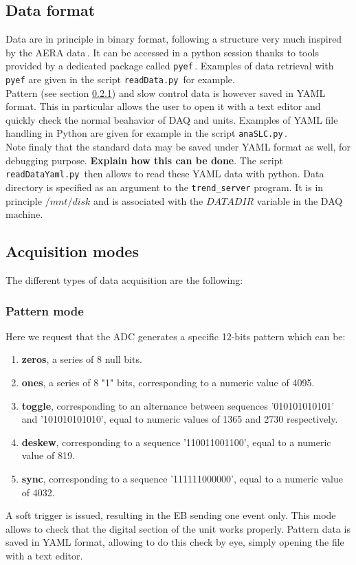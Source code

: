 \subsection{Data format}
\label{format}
Data are in principle in binary format, following a structure very much inspired by the AERA data\,\cite{DAQFormat_pres}. It can be accessed in a python session thanks to tools provided by a dedicated package called \texttt{pyef}\,\cite{pyef_git}. Examples of data retrieval with \texttt{pyef} are given in the script \texttt{readData.py}\,\cite{ana_git} for example. \\
%
Pattern (see section \ref{pattern}) and slow control data is however saved in YAML format. This in particular allows the user to open it with a text editor and quickly check the normal beahavior of DAQ and units. Examples of YAML file handling in Python are given for example in the script \texttt{anaSLC.py}\,\cite{ana_git}. \\
%
Note finaly that the standard data may be saved under YAML format as well, for debugging purpose. {\bf Explain how this can be done}. The script \texttt{readDataYaml.py}\,\cite{ana_git} then allows to read these YAML data with python.
%
Data directory is specified as an argument to the \texttt{trend\_server} program. It is in principle $/mnt/disk$ and is associated with the $DATADIR$ variable in the DAQ machine.

\subsection{Acquisition modes}
The different types of data acquisition are the following:

\subsubsection{Pattern mode}
\label{pattern}
Here we request that the ADC generates a specific 12-bits pattern which can be:
\begin{enumerate}[1)]
\item{{\bf zeros}, a series of 8 null bits.}
\item{{\bf ones}, a series of 8 "1" bits, corresponding to a numeric value of 4095.}
\item{{\bf toggle}, corresponding to an alternance between sequences '010101010101' and  '101010101010', equal to numeric values of 1365 and 2730 respectively.}
\item{{\bf deskew}, corresponding to a sequence '110011001100', equal to a numeric value of 819.}
\item{{\bf sync}, corresponding to a sequence '111111000000', equal to a numeric value of 4032.}
\end{enumerate} 
A soft trigger is issued, resulting in the EB sending one event only. This mode allows to check that the digital section of the unit works properly. Pattern data is saved in YAML format, allowing to do this check by eye, simply opening the file with a text editor.

